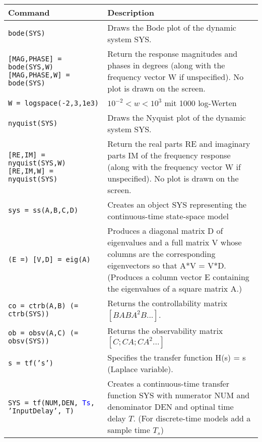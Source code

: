 \begin{center}
    \def\arraystretch{1.5}
    \begin{tabular}{p{5cm}|p{8.5cm}}
        \textbf{Command}    &   \textbf{Description}\\
        \hline
        \texttt{bode(SYS)}  &  Draws the Bode plot of the dynamic system SYS.\\
        
        \texttt{[MAG,PHASE] = bode(SYS,W) [MAG,PHASE,W] = bode(SYS)} & Return the response magnitudes and phases in degrees (along with the frequency vector W if unspecified).  No plot is drawn on the screen. \\
        
        \texttt{W = logspace(-2,3,1e3)} & $10^{-2} < w < 10^3$ mit 1000 log-Werten\\
        
        \texttt{nyquist(SYS)}  &  Draws the Nyquist plot of the dynamic system SYS. \\
        
        \texttt{[RE,IM] = nyquist(SYS,W) [RE,IM,W] = nyquist(SYS)} & Return the real parts RE and imaginary parts IM of the frequency response (along with the frequency vector W if unspecified).  No plot is drawn on the screen. \\
        
        \texttt{sys = ss(A,B,C,D)}  & Creates an object SYS representing the continuous-time state-space model \\
        
        \texttt{(E =) [V,D] = eig(A)}  &  Produces a diagonal matrix D of eigenvalues and a full matrix V whose columns are the corresponding eigenvectors so that A*V = V*D. (Produces a column vector E containing the eigenvalues of a square matrix A.)\\
        
        \texttt{co = ctrb(A,B) (= ctrb(SYS))}  & Returns the controllability matrix $[B AB A^2B ...]$.  \\
        
        \texttt{ob = obsv(A,C) (= obsv(SYS))}  & Returns the observability matrix $[C; CA; CA^2 ...]$ \\
        
        \texttt{s = tf('s')}  & Specifies the transfer function H(s) = s (Laplace variable). \\
        
        \texttt{SYS = tf(NUM,DEN, \textcolor{blue}{Ts}, 'InputDelay', T)} & Creates a continuous-time transfer function SYS with numerator NUM and denominator DEN and optinal time delay $T$. (For discrete-time models add a sample time $T_s$)\\
        

\end{tabular}
\end{center}
